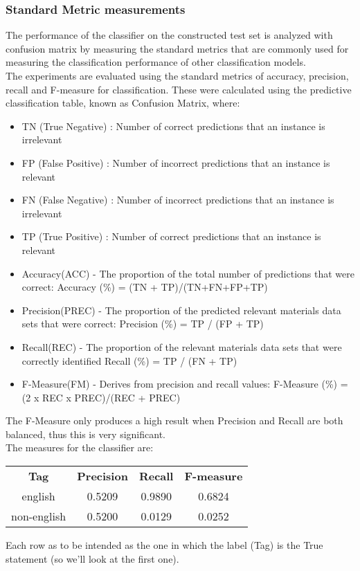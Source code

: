 \documentclass{article}
\begin{document}
            \subsubsection*{Standard Metric measurements}
            The performance of the classifier on the constructed test set is analyzed with confusion matrix by measuring the standard
            metrics that are commonly used for measuring the classification performance of other classification models.\\
            The experiments are evaluated using the standard metrics of accuracy, precision, recall and F-measure for classification.
            These were calculated using the predictive classification table, known as Confusion Matrix, where:\\
            \begin{itemize}
                \item TN (True Negative) : Number of correct predictions that an instance is irrelevant
                \item FP (False Positive) : Number of incorrect predictions that an instance is relevant
                \item FN (False Negative) : Number of incorrect predictions that an instance is irrelevant
                \item TP (True Positive) : Number of correct predictions that an instance is relevant
                \item Accuracy(ACC) - The proportion of the total number of predictions that were correct:
                    \subitem Accuracy (\%) = (TN + TP)/(TN+FN+FP+TP)
                \item Precision(PREC) - The proportion of the predicted relevant materials data sets that were correct:
                    \subitem Precision (\%) = TP / (FP + TP)
                \item Recall(REC) - The proportion of the relevant materials data sets that were correctly identified
                    \subitem Recall (\%) = TP / (FN + TP)
                \item F-Measure(FM) - Derives from precision and recall values:
                    \subitem F-Measure (\%) = (2 x REC x PREC)/(REC + PREC) 
            \end{itemize}
            The F-Measure only produces a high result when Precision and Recall are both balanced, thus this is very significant.\\
            The measures for the classifier are:
            \begin{center}
                \begin{tabular}{c|c|c|c}
                    \textbf{Tag} & \textbf{Precision} & \textbf{Recall} & \textbf{F-measure}\\
                    english & 0.5209 & 0.9890 & 0.6824\\
                    non-english & 0.5200 & 0.0129 & 0.0252
                \end{tabular}
            \end{center}
            Each row as to be intended as the one in which the label (Tag) is the True statement (so we'll look at the first one). 
\end{document}
